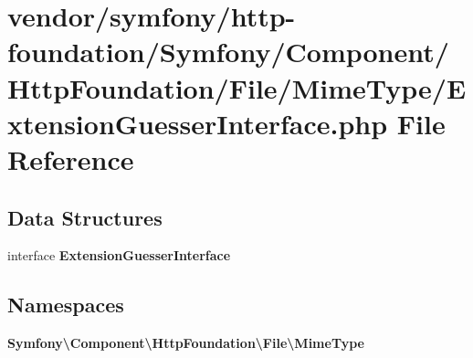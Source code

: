 \section{vendor/symfony/http-\/foundation/\+Symfony/\+Component/\+Http\+Foundation/\+File/\+Mime\+Type/\+Extension\+Guesser\+Interface.php File Reference}
\label{_extension_guesser_interface_8php}
\subsection*{Data Structures}
\begin{DoxyCompactItemize}
\item 
interface {\bf Extension\+Guesser\+Interface}
\end{DoxyCompactItemize}
\subsection*{Namespaces}
\begin{DoxyCompactItemize}
\item 
 {\bf Symfony\textbackslash{}\+Component\textbackslash{}\+Http\+Foundation\textbackslash{}\+File\textbackslash{}\+Mime\+Type}
\end{DoxyCompactItemize}

